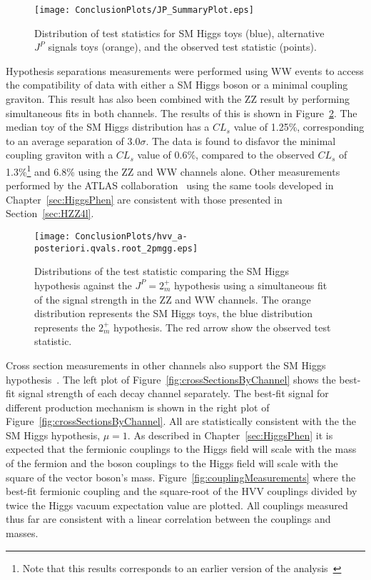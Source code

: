 \begin{figure}
\begin{center}
\texttt{[image: ConclusionPlots/JP\_SummaryPlot.eps]}
\caption{Distribution of test statistics for SM Higgs toys (blue),
 alternative $J^P$ signals toys (orange), and the observed test
statistic (points).}
\label{fig:spinParitySummary}

\end{center}
\end{figure}

Hypothesis separations measurements
were performed using WW events to access the compatibility 
of data with either a SM Higgs boson or a minimal coupling graviton.
This result has also been combined with the ZZ result by performing
simultaneous fits in both channels\cite{CMS:yva}.  The results of
this is shown in Figure~\ref{fig:2mp_spinCombination}.  The median
toy of the SM Higgs distribution
has a $CL_s$ value of 1.25\%, corresponding to an average
separation of $3.0\sigma$.  The data is found to disfavor the
minimal coupling graviton with a $CL_s$ value of 0.6\%, compared
to the observed $CL_s$ of 1.3\%\footnote{Note that this results
corresponds to an earlier version of the analysis~\cite{CMS:xwa}}
and 6.8\% using the ZZ and WW channels alone.  Other measurements
performed by the ATLAS collaboration~\cite{ATLAS:2013mla,ATLAS:2013nma} using the same tools developed in Chapter~\ref{sec:HiggsPhen}
are consistent with those presented in Section~\ref{sec:HZZ4l}.

\begin{figure}
\begin{center}
\texttt{[image: ConclusionPlots/hvv\_a-posteriori.qvals.root\_2pmgg.eps]}
\caption{Distributions of the test statistic comparing the 
SM Higgs hypothesis against the $J^P=2_m^+$ hypothesis using a
simultaneous fit of the signal strength in the ZZ and WW channels.
The orange distribution represents the SM Higgs toys, the blue 
distribution represents the $2_m^+$ hypothesis.  The red arrow
show the observed test statistic. }
\label{fig:2mp_spinCombination}
\end{center}
\end{figure}

Cross section measurements in other channels also support the 
SM Higgs hypothesis~\cite{CMS:yva}.  The left plot of
Figure~\ref{fig:crossSectionsByChannel} shows the best-fit signal 
strength of each decay channel separately.  The best-fit signal
for different production mechanism is shown
in the right plot of Figure~\ref{fig:crossSectionsByChannel}.
All are statistically consistent with the the SM Higgs hypothesis,
$\mu=1$.  
As described in Chapter~\ref{sec:HiggsPhen} it is expected that
the fermionic couplings to the Higgs field will scale with the
mass of the fermion and the boson couplings to the Higgs field
will scale with the square of the vector boson's mass.  
Figure~\ref{fig:couplingMeasurements} where the best-fit
fermionic coupling and the square-root of the HVV couplings
divided by twice the Higgs vacuum expectation value are plotted.
All couplings measured thus far are consistent with a linear
correlation between the couplings and masses.  

